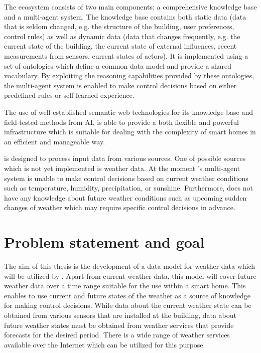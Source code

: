 The \thinkhome ecosystem consists of two main components: a comprehensive knowledge base and a multi-agent system. The knowledge base contains both static data (data that is seldom changed, e.g. the structure of the building, user preferences, control rules) as well as dynamic data (data that changes frequently, e.g. the current state of the building, the current state of external influences, recent measurements from sensors, current states of actors). It is implemented using a set of ontologies which define a common data model and provide a shared vocabulary. By exploiting the reasoning capabilities provided by these ontologies, the multi-agent system is enabled to make control decisions based on either predefined rules or self-learned experience.

The use of well-established semantic web technologies for its knowledge base and field-tested methods from AI, \thinkhome is able to provide a both flexible and powerful infrastructure which is suitable for dealing with the complexity of smart homes in an efficient and manageable way.

\thinkhome is designed to process input data from various sources. One of possible sources which is not yet implemented is weather data. At the moment \thinkhome's multi-agent system is unable to make control decisions based on current weather conditions such as temperature, humidity, precipitation, or sunshine. Furthermore, \thinkhome does not have any knowledge about future weather conditions such as upcoming sudden changes of weather which may require specific control decisions in advance.

\section{Problem statement and goal}

The aim of this thesis is the development of a data model for weather data which will be utilized by \thinkhome. Apart from current weather data, this model will cover future weather data over a time range suitable for the use within a smart home. This enables \thinkhome to use current and future states of the weather as a source of knowledge for making control decisions. While data about the current weather state can be obtained from various sensors that are installed at the building, data about future weather states must be obtained from weather services that provide forecasts for the desired period. There is a wide range of weather services available over the Internet which can be utilized for this purpose.

